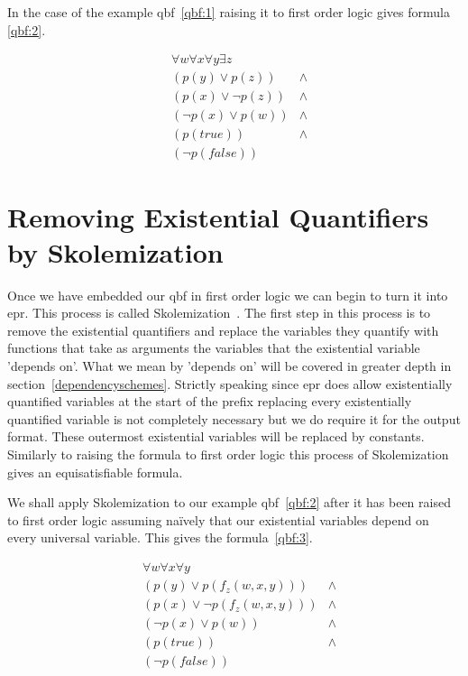 In the case of the example \gls{qbf}~\ref{qbf:1} raising it to first order logic gives formula \ref{qbf:2}.

\begin{equation} \label{qbf:2}
\begin{aligned}
&\forall w \forall x \forall y \exists z\\
&(p(y) \lor p(z)) &\land\\
&(p(x) \lor \neg p(z)) &\land\\
&(\neg p(x) \lor p(w)) &\land\\
&(p(true)) &\land\\
&(\neg p(false))
\end{aligned}
\end{equation}

\section{Removing Existential Quantifiers by Skolemization} \label{skolemization}
Once we have embedded our \gls{qbf} in first order logic we can begin to turn it into \gls{epr}. This process is called Skolemization~\cite{skolemization}. The first step in this process is to remove the existential quantifiers and replace the variables they quantify with functions that take as arguments the variables that the existential variable 'depends on'. What we mean by 'depends on' will be covered in greater depth in section~\ref{dependencyschemes}. Strictly speaking since \gls{epr} does allow existentially quantified variables at the start of the prefix replacing every existentially quantified variable is not completely necessary but we do require it for the output format. These outermost existential variables will be replaced by constants. Similarly to raising the formula to first order logic this process of Skolemization gives an equisatisfiable formula.

We shall apply Skolemization to our example \gls{qbf}~\ref{qbf:2} after it has been raised to first order logic assuming na{\"i}vely that our existential variables depend on every universal variable. This gives the formula~\ref{qbf:3}.

\begin{equation} \label{qbf:3}
\begin{aligned}
&\forall w \forall x \forall y\\
&(p(y) \lor p(f_z(w, x, y))) &\land\\
&(p(x) \lor \neg p(f_z(w, x, y))) &\land\\
&(\neg p(x) \lor p(w)) &\land\\
&(p(true)) &\land\\
&(\neg p(false))
\end{aligned}
\end{equation}

